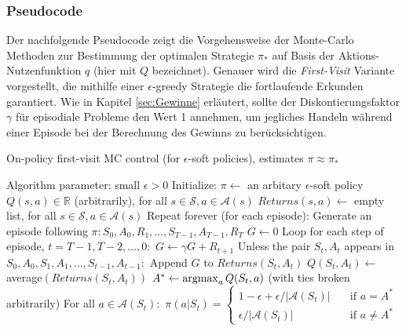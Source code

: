 \subsubsection{Pseudocode}
Der nachfolgende Pseudocode \cite[S.~101]{Sutton1998} zeigt die Vorgehensweise der Monte-Carlo Methoden zur Bestimmung der optimalen Strategie $\pi_*$ auf Basis der Aktions-Nutzenfunktion $q$ (hier mit $Q$ bezeichnet). Genauer wird die \textit{First-Visit} Variante vorgestellt, die mithilfe einer $\epsilon$-greedy Strategie die fortlaufende Erkunden garantiert. Wie in Kapitel \ref{sec:Gewinne} erläutert, sollte der Diskontierungsfaktor $\gamma$ für episodiale Probleme den Wert 1 annehmen, um jegliches Handeln während einer Episode bei der Berechnung des Gewinns zu berücksichtigen.
\par 
\begin{algorithm}
    \caption{On-policy first-visit MC control (for $\epsilon$-soft policies), estimates $\pi \approx \pi_*$}
    \begin{algorithmic}[1]
        \State Algorithm parameter: small $\epsilon > 0$
        \State Initialize:
        \Indent
           \State $\pi \gets$ an arbitary $\epsilon$-soft policy
           \State $Q(s,a) \in \mathbb{R}$ (arbitrarily), for all $s \in \mathcal{S}, a \in \mathcal{A}(s)$
           \State $Returns(s,a) \gets$ empty list, for all $s \in \mathcal{S}, a \in \mathcal{A}(s)$
        \EndIndent
        \State Repeat forever (for each episode):
        \Indent
            \State Generate an episode following $\pi: S_0, A_0, R_1, \dots, S_{T-1}, A_{T-1}, R_T$
            \State $G \gets 0$
            \State Loop for each step of episode, $t= T-1,T-2, \dots, 0:$
            \Indent
                \State $G \gets \gamma G + R_{t+1}$
                \State Unless the pair $S_t, A_t$ appears in $S_0, A_0, S_1, A_1, \dots ,S_{t-1}, A_{t-1}:$
                \Indent
                    \State Append $G$ to $Returns(S_t,A_t)$
                    \State $Q(S_t,A_t) \gets$ average$(Returns(S_t,A_t))$
                    \State $A^* \gets \operatorname*{argmax}_a Q(S_t, a)$ (with ties broken arbitrarily)
                    \State For all $a \in \mathcal{A}(S_t):$
                    \Indent
                     \State  $\pi(a|S_t) =   
                        \begin{cases}
                            1-\epsilon + \epsilon / |\mathcal{A}(S_t)|      & \quad \text{if } a = A^* \\
                            \epsilon / |\mathcal{A}(S_t)|  & \quad \text{if } a \neq A^*
                        \end{cases}$
                    \EndIndent
                \EndIndent
            \EndIndent
        \EndIndent 
    \end{algorithmic}
\end{algorithm}
